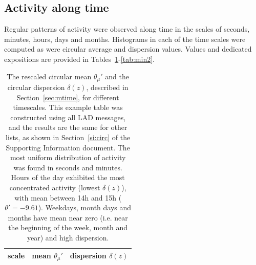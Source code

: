 \documentclass[%
	aip,
	jmp,%
	amsmath,amssymb,
	reprint,%
]{revtex4-1}
\begin{document}
\subsection{Activity along time}\label{constDisc}
Regular patterns of activity were observed along time
in the scales of seconds, minutes, hours, days and months.
Histograms in each of the time scales were computed as were circular average and dispersion values.
Values and dedicated expositions are provided in Tables~\ref{tab:circ}-\ref{tab:min2}.

\begin{table}
	\caption{The rescaled circular mean $\theta_\mu'$ and the circular dispersion $\delta(z)$, described in Section~\ref{sec:mtime}, for different timescales.
		This example table was constructed using all LAD messages, and the results are the same for other lists, as shown in Section~\ref{si:circ} of the Supporting Information document.
	The most uniform distribution of activity was found in seconds and minutes.
	Hours of the day exhibited the most concentrated activity (lowest $\delta(z)$), with mean between 14h and 15h ($\theta'=-9.61$).
	Weekdays, month days and months have mean near zero (i.e. near the beginning of the week, month and year) and high dispersion.}
	\begin{center}
		\begin{tabular}{ |l|| c|c| }
			\hline
			scale & mean $\theta_\mu'$ & dispersion $\delta(z)$  \\ \hline
			
		\end{tabular}
	\end{center}
	\label{tab:circ}
\end{table}

\begin{table}
	\caption{Activity percentages along the hours of the day. Nearly identical distributions are found on other systems as shown in Section~\ref{si:hours} of the Supporting Information document.
	Higher activity was observed between noon and 6pm (with 1/3 of total day activity), followed by the time period between 6pm and midnight. Around 2/3 of the activity takes place from noon to midnight.
Nevertheless, the activity peak occurs between 11 a.m. and 12 p.m. This example and empirical table corresponds to the activity in CPP.}
	\footnotesize
	
	\label{tab:hin}
\end{table}
\end{document}
